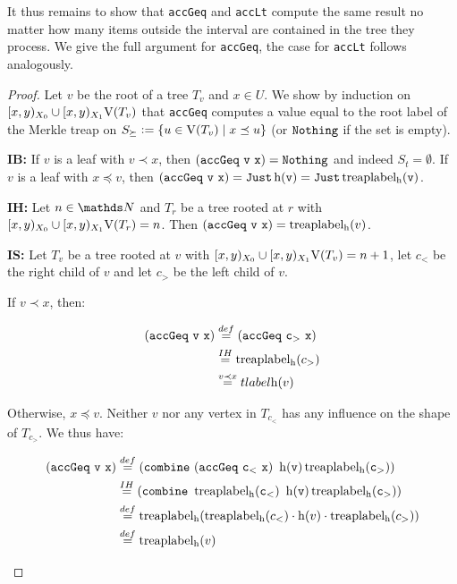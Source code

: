 It thus remains to show that \texttt{accGeq} and \texttt{accLt} compute the same result no matter how many items outside the interval are contained in the tree they process. We give the full argument for \texttt{accGeq}, the case for \texttt{accLt} follows analogously.

\begin{proof}
Let $v$ be the root of a tree $T_v$ and $x \in U$. We show by induction on $[{x},{y})_{X_0} \cup [{x},{y})_{X_1}{\operatorname{V}(T_v)}$ that \texttt{accGeq} computes a value equal to the root label of the Merkle treap on $S_{\succeq} \vcentcolon= \{u \in \operatorname{V}(T_v) \mid x \preceq u\}$ (or $\mathtt{Nothing}$ if the set is empty).

\textbf{IB:} If $v$ is a leaf with $v \prec x$, then $\mathtt{(accGeq\ v\ x)} = \mathtt{Nothing}$ and indeed $S_{t} = \emptyset$. If $v$ is a leaf with $x \preceq v$, then $\mathtt{(accGeq\ v\ x)} =  \mathtt{Just \operatorname{h}(v)} = \mathtt{Just \operatorname{treaplabel_{\operatorname{h}}}(v)}$.

\textbf{IH:} Let  $n \in \N$ and $T_r$ be a tree rooted at $r$ with $[{x},{y})_{X_0} \cup [{x},{y})_{X_1}{\operatorname{V}(T_r)} = n$. Then $\mathtt{(accGeq\ v\ x)} = \operatorname{treaplabel_{\operatorname{h}}}(v)$.

\textbf{IS:} Let $T_v$ be a tree rooted at $v$ with $[{x},{y})_{X_0} \cup [{x},{y})_{X_1}{\operatorname{V}(T_v)} = n + 1$, let $c_{<}$ be the right child of $v$  and let $c_
{>}$ be the left child of $v$.

\begin{caselist}
\case If $v \prec x$, then:

\begin{align*}
\mathtt{(accGeq\ v\ x)} &\overset{def}= \mathtt{(accGeq\ c_{>}\ x)}\\
&\overset{IH}= \tlabel{\h}(c_{>})\\
&\overset{v \prec x}= tlabel{\h}(v)\\
\end{align*}

\case Otherwise, $x \preceq v$. Neither $v$ nor any vertex in $T_{c_{<}}$ has any influence on the shape of $T_{c_{>}}$. We thus have:

\begin{align*}
\mathtt{(accGeq\ v\ x)} &\overset{def}= \mathtt{(combine\ (accGeq\ c_{<}\ x)\ \h(v) \tlabel{\h}(c_{>}))}\\
&\overset{IH}= \mathtt{(combine\ \tlabel{\h}(c_{<})\ \h(v) \tlabel{\h}(c_{>}))}\\
&\overset{def}= \tlabel{\h}(\tlabel{\h}(c_{<}) \concatenate \h(v) \concatenate \tlabel{\h}(c_{>}))\\
&\overset{def}= \tlabel{\h}(v)\\
\end{align*}
\end{caselist}
\end{proof}

